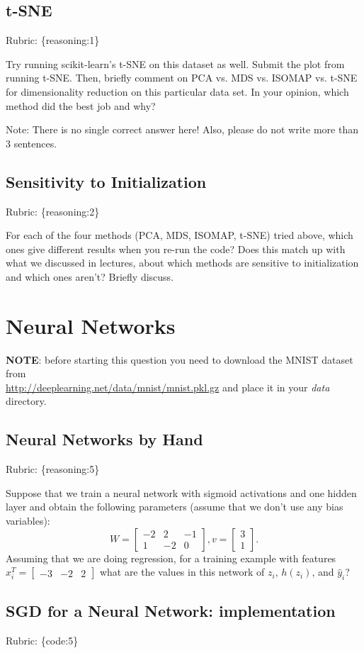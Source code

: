 \documentclass{article}
\def\rubric#1{\gre{Rubric: \{#1\}}}{}
\def\blu#1{{\color{blu}#1}}
\def\gre#1{{\color{gre}#1}}
\newcommand{\mat}[1]{\begin{bmatrix}#1\end{bmatrix}}
\begin{document}
\subsection{t-SNE}
\rubric{reasoning:1}

Try running scikit-learn's t-SNE on this dataset as well. \blu{Submit the plot from running t-SNE. Then, briefly comment on PCA vs. MDS vs. ISOMAP vs. t-SNE for dimensionality reduction on this particular data set. In your opinion, which method did the best job and why?}

Note: There is no single correct answer here! Also, please do not write more than 3 sentences.


\subsection{Sensitivity to Initialization}
\rubric{reasoning:2}

For each of the four methods (PCA, MDS, ISOMAP, t-SNE) tried above, which ones give different results when you re-run the code? Does this match up with what we discussed in lectures, about which methods are sensitive to initialization and which ones aren't? Briefly discuss.


\section{Neural Networks}

\textbf{NOTE}: before starting this question you need to download the MNIST dataset from \\ \url{http://deeplearning.net/data/mnist/mnist.pkl.gz} and place it in your \emph{data} directory.


\subsection{Neural Networks by Hand}
\rubric{reasoning:5}

Suppose that we train a neural network with sigmoid activations and one hidden layer and obtain the following parameters (assume that we don't use any bias variables):
\[
W = \mat{-2 & 2 & -1\\1 & -2 & 0}, v = \mat{3 \\1}.
\]
Assuming that we are doing regression, \blu{for a training example with features $x_i^T = \mat{-3 &-2 & 2}$ what are the values in this network of $z_i$, $h(z_i)$, and $\hat{y}_i$?}

\subsection{SGD for a Neural Network: implementation}
\rubric{code:5}
\end{document}
